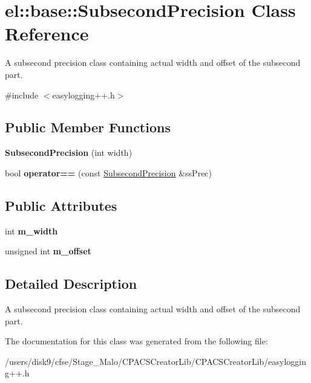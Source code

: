 \hypertarget{classel_1_1base_1_1SubsecondPrecision}{\section{el\-:\-:base\-:\-:Subsecond\-Precision Class Reference}
\label{classel_1_1base_1_1SubsecondPrecision}
}


A subsecond precision class containing actual width and offset of the subsecond part.  




{\ttfamily \#include $<$easylogging++.\-h$>$}

\subsection*{Public Member Functions}
\begin{DoxyCompactItemize}
\item 
\hypertarget{classel_1_1base_1_1SubsecondPrecision_aff4556f058704e26df60907bf95998ff}{{\bfseries Subsecond\-Precision} (int width)}\label{classel_1_1base_1_1SubsecondPrecision_aff4556f058704e26df60907bf95998ff}

\item 
\hypertarget{classel_1_1base_1_1SubsecondPrecision_a5bb2fe83619b7007aac61252e4dc5186}{bool {\bfseries operator==} (const \hyperlink{classel_1_1base_1_1SubsecondPrecision}{Subsecond\-Precision} \&ss\-Prec)}\label{classel_1_1base_1_1SubsecondPrecision_a5bb2fe83619b7007aac61252e4dc5186}

\end{DoxyCompactItemize}
\subsection*{Public Attributes}
\begin{DoxyCompactItemize}
\item 
\hypertarget{classel_1_1base_1_1SubsecondPrecision_a7e24991325599de4d9ff96ac691cbbf6}{int {\bfseries m\-\_\-width}}\label{classel_1_1base_1_1SubsecondPrecision_a7e24991325599de4d9ff96ac691cbbf6}

\item 
\hypertarget{classel_1_1base_1_1SubsecondPrecision_a3d14e3d57e57e799d105f7b86d190dcf}{unsigned int {\bfseries m\-\_\-offset}}\label{classel_1_1base_1_1SubsecondPrecision_a3d14e3d57e57e799d105f7b86d190dcf}

\end{DoxyCompactItemize}


\subsection{Detailed Description}
A subsecond precision class containing actual width and offset of the subsecond part. 

The documentation for this class was generated from the following file\-:\begin{DoxyCompactItemize}
\item 
/users/disk9/cfse/\-Stage\-\_\-\-Malo/\-C\-P\-A\-C\-S\-Creator\-Lib/\-C\-P\-A\-C\-S\-Creator\-Lib/easylogging++.\-h\end{DoxyCompactItemize}
